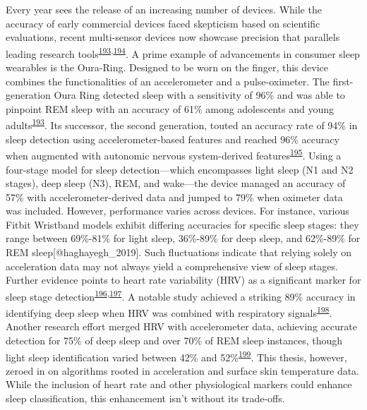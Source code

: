 \documentclass[
  10pt,
]{scrbook}
\begin{document}
Every year sees the release of an increasing number of devices. While
the accuracy of early commercial devices faced skepticism based on
scientific evaluations, recent multi-sensor devices now showcase
precision that parallels leading research
tools\textsuperscript{\protect\hyperlink{ref-dezambotti_2019}{193},\protect\hyperlink{ref-rentz_2021}{194}}.
A prime example of advancements in consumer sleep wearables is the
Oura-Ring. Designed to be worn on the finger, this device combines the
functionalities of an accelerometer and a pulse-oximeter. The
first-generation Oura Ring detected sleep with a sensitivity of 96\% and
was able to pinpoint REM sleep with an accuracy of 61\% among
adolescents and young
adults\textsuperscript{\protect\hyperlink{ref-dezambotti_2019}{193}}.
Its successor, the second generation, touted an accuracy rate of 94\% in
sleep detection using accelerometer-based features and reached 96\%
accuracy when augmented with autonomic nervous system-derived
features\textsuperscript{\protect\hyperlink{ref-altini_2021}{195}}.
Using a four-stage model for sleep detection---which encompasses light
sleep (N1 and N2 stages), deep sleep (N3), REM, and wake---the device
managed an accuracy of 57\% with accelerometer-derived data and jumped
to 79\% when oximeter data was included. However, performance varies
across devices. For instance, various Fitbit Wristband models exhibit
differing accuracies for specific sleep stages: they range between
69\%-81\% for light sleep, 36\%-89\% for deep sleep, and 62\%-89\% for
REM sleep{[}@haghayegh\_2019{]}. Such fluctuations indicate that relying
solely on acceleration data may not always yield a comprehensive view of
sleep stages. Further evidence points to heart rate variability (HRV) as
a significant marker for sleep stage
detection\textsuperscript{\protect\hyperlink{ref-herzig_2018}{196},\protect\hyperlink{ref-chouchou_2014}{197}}.
A notable study achieved a striking 89\% accuracy in identifying deep
sleep when HRV was combined with respiratory
signals\textsuperscript{\protect\hyperlink{ref-long_2017}{198}}. Another
research effort merged HRV with accelerometer data, achieving accurate
detection for 75\% of deep sleep and over 70\% of REM sleep instances,
though light sleep identification varied between 42\% and
52\%\textsuperscript{\protect\hyperlink{ref-muzet_2016}{199}}. This
thesis, however, zeroed in on algorithms rooted in acceleration and
surface skin temperature data. While the inclusion of heart rate and
other physiological markers could enhance sleep classification, this
enhancement isn't without its trade-offs.
\end{document}
